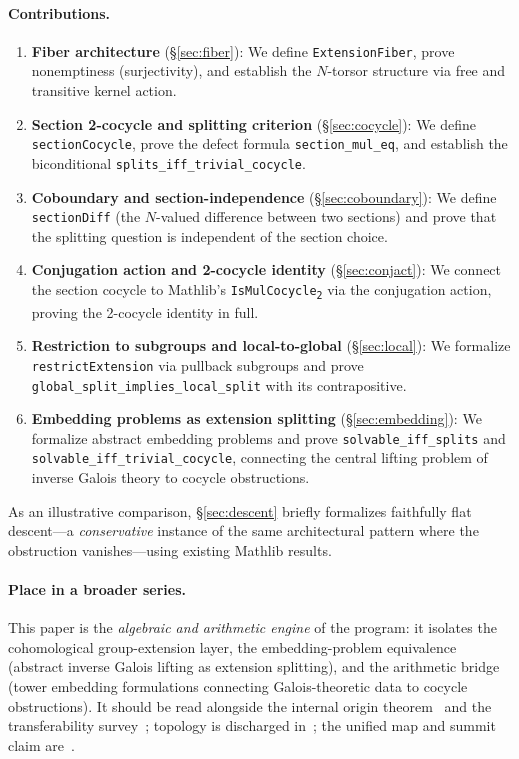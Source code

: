 \documentclass[11pt]{article}
\newcommand{\lean}[1]{\texttt{#1}}
\newcommand{\IsMulCocycle}{\lean{IsMulCocycle\textsubscript{2}}}
\begin{document}
\paragraph{Contributions.}
\begin{enumerate}[leftmargin=2em]
  \item \textbf{Fiber architecture} (\S\ref{sec:fiber}): We define
    \lean{ExtensionFiber}, prove nonemptiness (surjectivity), and establish the
    $N$-torsor structure via free and transitive kernel action.

  \item \textbf{Section 2-cocycle and splitting criterion} (\S\ref{sec:cocycle}):
    We define \lean{sectionCocycle}, prove the defect formula
    \lean{section\_mul\_eq}, and establish the biconditional
    \lean{splits\_iff\_trivial\_cocycle}.

  \item \textbf{Coboundary and section-independence} (\S\ref{sec:coboundary}):
    We define \lean{sectionDiff} (the $N$-valued difference between two sections)
    and prove that the splitting question is independent of the section choice.

  \item \textbf{Conjugation action and 2-cocycle identity} (\S\ref{sec:conjact}):
    We connect the section cocycle to Mathlib's \IsMulCocycle{}
    via the conjugation action, proving the 2-cocycle identity in full.

  \item \textbf{Restriction to subgroups and local-to-global} (\S\ref{sec:local}):
    We formalize \lean{restrictExtension} via pullback subgroups and prove
    \lean{global\_split\_implies\_local\_split} with its contrapositive.

  \item \textbf{Embedding problems as extension splitting} (\S\ref{sec:embedding}):
    We formalize abstract embedding problems and prove
    \lean{solvable\_iff\_splits} and \lean{solvable\_iff\_trivial\_cocycle},
    connecting the central lifting problem of inverse Galois theory to
    cocycle obstructions.
\end{enumerate}

\noindent
As an illustrative comparison, \S\ref{sec:descent} briefly formalizes faithfully
flat descent---a \emph{conservative} instance of the same architectural pattern
where the obstruction vanishes---using existing Mathlib results.

\paragraph{Place in a broader series.}
This paper is the \emph{algebraic and arithmetic engine} of the program: it isolates
the cohomological group-extension layer, the embedding-problem equivalence (abstract
inverse Galois lifting as extension splitting), and the arithmetic bridge (tower
embedding formulations connecting Galois-theoretic data to cocycle obstructions).
It should be read alongside the internal origin theorem~\cite{SpivackIC} and the
transferability survey~\cite{SpivackValidation}; topology is discharged
in~\cite{SpivackQuillen}; the unified map and summit claim are~\cite{SpivackSynthesis,SpivackSummit}.
\end{document}
